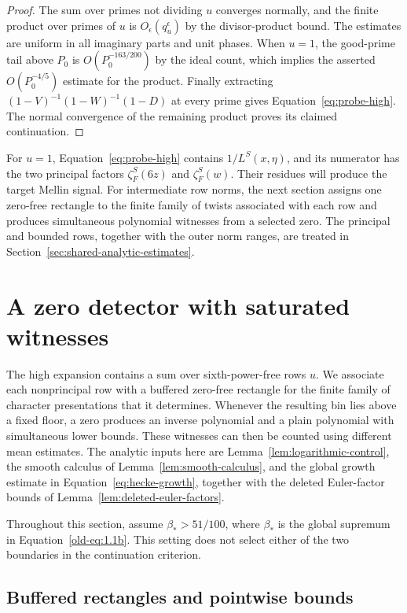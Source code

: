 \documentclass[11pt,a4paper]{article}
\numberwithin{equation}{section}
\numberwithin{figure}{section}
\theoremstyle{definition}
\theoremstyle{remark}
\begin{document}
\begin{proof}
The sum over primes not dividing $u$ converges normally, and the
finite product over primes of $u$ is $O_\epsilon(q_u^\epsilon)$
by the divisor-product bound.  The estimates are uniform in all
imaginary parts and unit phases.  When $u=1$, the good-prime tail
above $P_0$ is $O(P_0^{-163/200})$ by the ideal count, which implies
the asserted $O(P_0^{-4/5})$ estimate for the product.
Finally extracting $(1-V)^{-1}(1-W)^{-1}(1-D)$ at every prime
gives Equation~\eqref{eq:probe-high}.  The normal convergence of
the remaining product proves its claimed continuation.
\end{proof}

For $u=1$, Equation~\eqref{eq:probe-high} contains
$1/L^S(x,\eta)$, and its numerator has the two principal factors
$\zeta_F^S(6z)$ and $\zeta_F^S(w)$. Their residues will produce the
target Mellin signal. For intermediate row norms, the next section
assigns one zero-free rectangle to the finite family of twists associated
with each row and produces simultaneous polynomial witnesses from a
selected zero. The principal and bounded rows, together with the
outer norm ranges, are treated in
Section~\ref{sec:shared-analytic-estimates}.

\section{A zero detector with saturated witnesses}\label{sec:detector}

The high expansion contains a sum over sixth-power-free rows \(u\).
We associate each nonprincipal row with a buffered zero-free rectangle
for the finite family of character presentations that it determines.
Whenever the resulting bin lies above a fixed floor, a zero produces
an inverse polynomial and a plain polynomial with simultaneous lower
bounds.  These witnesses can then be counted using different mean
estimates.  The analytic inputs here are Lemma~\ref{lem:logarithmic-control},
the smooth calculus of Lemma~\ref{lem:smooth-calculus}, and the global
growth estimate in Equation~\eqref{eq:hecke-growth}, together with the
deleted Euler-factor bounds of Lemma~\ref{lem:deleted-euler-factors}.

Throughout this section, assume \(\beta_*>51/100\), where \(\beta_*\)
is the global supremum in Equation~\eqref{old-eq:1.1b}.  This setting
does not select either of the two boundaries in the continuation
criterion.

\subsection{Buffered rectangles and pointwise bounds}
\end{document}

